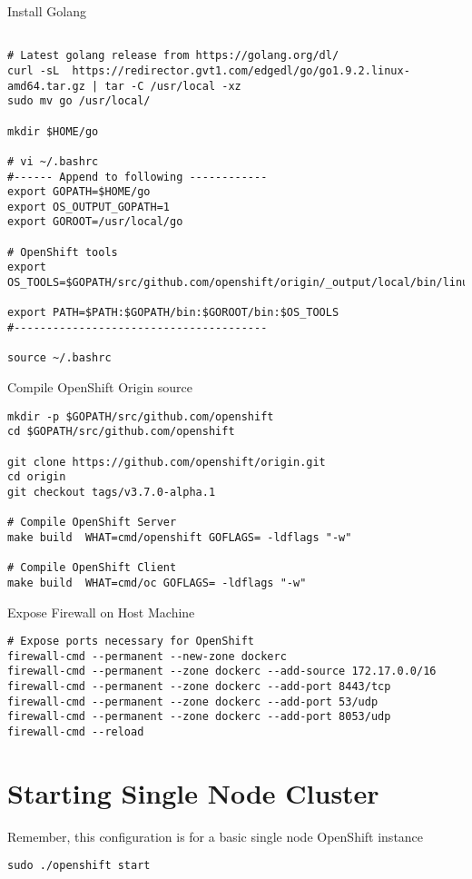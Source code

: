 \documentclass{article}
\begin{document}
Install Golang
\begin{lstlisting}[style=shell]

# Latest golang release from https://golang.org/dl/
curl -sL  https://redirector.gvt1.com/edgedl/go/go1.9.2.linux-amd64.tar.gz | tar -C /usr/local -xz
sudo mv go /usr/local/

mkdir $HOME/go

# vi ~/.bashrc
#------ Append to following ------------
export GOPATH=$HOME/go
export OS_OUTPUT_GOPATH=1
export GOROOT=/usr/local/go

# OpenShift tools
export OS_TOOLS=$GOPATH/src/github.com/openshift/origin/_output/local/bin/linux/amd64/

export PATH=$PATH:$GOPATH/bin:$GOROOT/bin:$OS_TOOLS
#---------------------------------------

source ~/.bashrc
\end{lstlisting}

Compile OpenShift Origin source
\begin{lstlisting}[style=shell]
mkdir -p $GOPATH/src/github.com/openshift
cd $GOPATH/src/github.com/openshift

git clone https://github.com/openshift/origin.git
cd origin
git checkout tags/v3.7.0-alpha.1

# Compile OpenShift Server
make build  WHAT=cmd/openshift GOFLAGS= -ldflags "-w"

# Compile OpenShift Client
make build  WHAT=cmd/oc GOFLAGS= -ldflags "-w"
\end{lstlisting}

Expose Firewall on Host Machine

\begin{lstlisting}[style=shell]
# Expose ports necessary for OpenShift
firewall-cmd --permanent --new-zone dockerc
firewall-cmd --permanent --zone dockerc --add-source 172.17.0.0/16
firewall-cmd --permanent --zone dockerc --add-port 8443/tcp
firewall-cmd --permanent --zone dockerc --add-port 53/udp
firewall-cmd --permanent --zone dockerc --add-port 8053/udp
firewall-cmd --reload
\end{lstlisting}

\section{Starting Single Node Cluster}
Remember, this configuration is for a basic single node OpenShift instance 

\begin{lstlisting}[style=shell]
sudo ./openshift start
\end{lstlisting}
\end{document}
